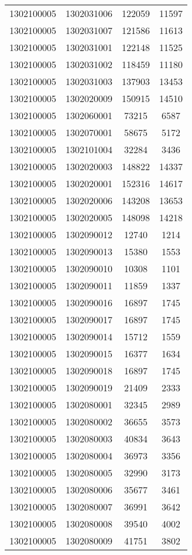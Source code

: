 \begin{longtable}{llcc}
1302100005 & 1302031006 & 122059 & 11597\\
1302100005 & 1302031007 & 121586 & 11613\\
1302100005 & 1302031001 & 122148 & 11525\\
1302100005 & 1302031002 & 118459 & 11180\\
1302100005 & 1302031003 & 137903 & 13453\\
1302100005 & 1302020009 & 150915 & 14510\\
1302100005 & 1302060001 & 73215 & 6587\\
1302100005 & 1302070001 & 58675 & 5172\\
1302100005 & 1302101004 & 32284 & 3436\\
1302100005 & 1302020003 & 148822 & 14337\\
1302100005 & 1302020001 & 152316 & 14617\\
1302100005 & 1302020006 & 143208 & 13653\\
1302100005 & 1302020005 & 148098 & 14218\\
1302100005 & 1302090012 & 12740 & 1214\\
1302100005 & 1302090013 & 15380 & 1553\\
1302100005 & 1302090010 & 10308 & 1101\\
1302100005 & 1302090011 & 11859 & 1337\\
1302100005 & 1302090016 & 16897 & 1745\\
1302100005 & 1302090017 & 16897 & 1745\\
1302100005 & 1302090014 & 15712 & 1559\\
1302100005 & 1302090015 & 16377 & 1634\\
1302100005 & 1302090018 & 16897 & 1745\\
1302100005 & 1302090019 & 21409 & 2333\\
1302100005 & 1302080001 & 32345 & 2989\\
1302100005 & 1302080002 & 36655 & 3573\\
1302100005 & 1302080003 & 40834 & 3643\\
1302100005 & 1302080004 & 36973 & 3356\\
1302100005 & 1302080005 & 32990 & 3173\\
1302100005 & 1302080006 & 35677 & 3461\\
1302100005 & 1302080007 & 36991 & 3642\\
1302100005 & 1302080008 & 39540 & 4002\\
1302100005 & 1302080009 & 41751 & 3802\\

\end{longtable}
